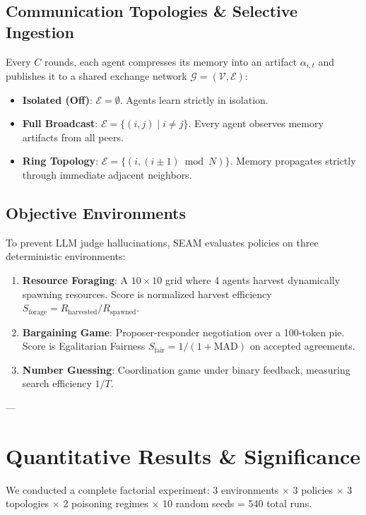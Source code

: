 \documentclass[11pt,a4paper]{article}
\begin{document}
\subsection{Communication Topologies & Selective Ingestion}
Every $C$ rounds, each agent compresses its memory into an artifact $\alpha_{i, t}$ and publishes it to a shared exchange network $\mathcal{G} = (\mathcal{V}, \mathcal{E})$:
\begin{itemize}
    \item \textbf{Isolated (Off)}: $\mathcal{E} = \emptyset$. Agents learn strictly in isolation.
    \item \textbf{Full Broadcast}: $\mathcal{E} = \{(i, j) \mid i \neq j\}$. Every agent observes memory artifacts from all peers.
    \item \textbf{Ring Topology}: $\mathcal{E} = \{(i, (i \pm 1) \bmod N)\}$. Memory propagates strictly through immediate adjacent neighbors.
\end{itemize}

\subsection{Objective Environments}
To prevent LLM judge hallucinations, SEAM evaluates policies on three deterministic environments:
\begin{enumerate}
    \item \textbf{Resource Foraging}: A $10 \times 10$ grid where 4 agents harvest dynamically spawning resources. Score is normalized harvest efficiency $S_{\text{forage}} = R_{\text{harvested}} / R_{\text{spawned}}$.
    \item \textbf{Bargaining Game}: Proposer-responder negotiation over a 100-token pie. Score is Egalitarian Fairness $S_{\text{fair}} = 1 / (1 + \text{MAD})$ on accepted agreements.
    \item \textbf{Number Guessing}: Coordination game under binary feedback, measuring search efficiency $1/T$.
\end{enumerate}

---

\section{Quantitative Results & Significance}
\label{sec:results}

We conducted a complete factorial experiment: 3 environments $\times$ 3 policies $\times$ 3 topologies $\times$ 2 poisoning regimes $\times$ 10 random seeds = 540 total runs.
\end{document}
